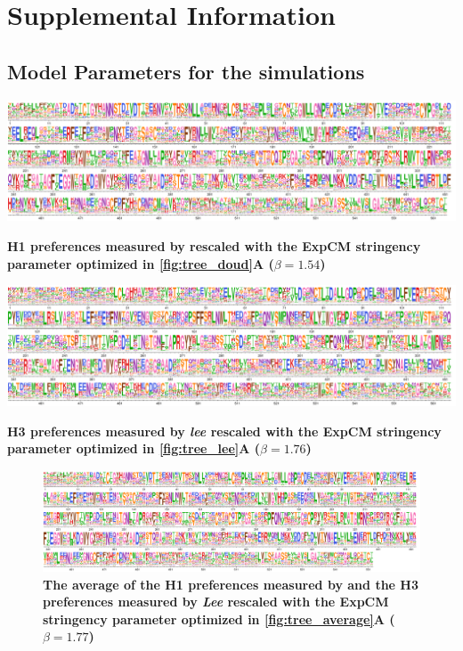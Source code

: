 \documentclass[11pt]{article}
\begin{document}
\newpage
\section*{Supplemental Information}

\subsection*{Model Parameters for the simulations}

\begin{suppfig}[H]
\centerline{\includegraphics[width=\textwidth]{figures/prefs_doud}}
\caption{\label{suppfig:prefs_doud}
\textbf{H1 preferences measured by \cite{doud2016accurate} rescaled with the ExpCM stringency parameter optimized in \ref{fig:tree_doud}A  ($\beta = 1.54$)} 
}
\end{suppfig}

\begin{suppfig}[H]
\centerline{\includegraphics[width=\textwidth]{figures/prefs_lee}}
\caption{\label{suppfig:prefs_lee}
\textbf{H3 preferences measured by \textit{lee} rescaled with the ExpCM stringency parameter optimized in \ref{fig:tree_lee}A  ($\beta = 1.76$)} 
}
\end{suppfig}

\begin{figure}[H]
\centerline{\includegraphics[width=\textwidth]{figures/prefs_average}}
\caption{\label{fig:prefs_average}
\textbf{The average of the H1 preferences measured by \cite{doud2016accurate} and the H3 preferences measured by \textit{Lee} rescaled with the ExpCM stringency parameter optimized in \ref{fig:tree_average}A  ($\beta = 1.77$)}}
\end{figure}
\end{document}

